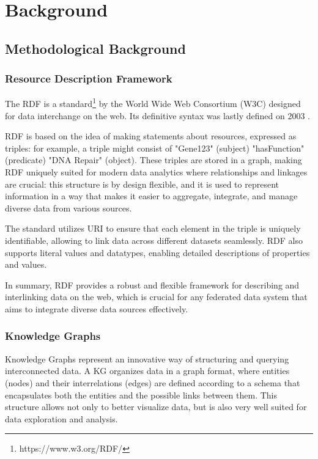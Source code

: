 
\chapter{Background}
\label{chp:background}

\section{Methodological Background}
\subsection{Resource Description Framework}
The \ac{RDF} is a standard\footnote{https://www.w3.org/RDF/} by the World Wide Web Consortium (W3C) designed for data interchange on the web. Its definitive syntax was lastly defined on 2003 \cite{beckett2004rdf}.

\ac{RDF} is based on the idea of making statements about resources, expressed as triples: for example, a triple might consist of "Gene123" (subject) "hasFunction" (predicate) "DNA Repair" (object). These triples are stored in a graph, making \ac{RDF} uniquely suited for modern data analytics where relationships and linkages are crucial: this structure is by design flexible, and it is used to represent information in a way that makes it easier to aggregate, integrate, and manage diverse data from various sources.

The standard utilizes \ac{URI} to ensure that each element in the triple is uniquely identifiable, allowing to link data across different datasets seamlessly. \ac{RDF} also supports literal values and datatypes, enabling detailed descriptions of properties and values.

In summary, \ac{RDF} provides a robust and flexible framework for describing and interlinking data on the web, which is crucial for any federated data system that aims to integrate diverse data sources effectively.

\subsection{Knowledge Graphs}
Knowledge Graphs represent an innovative way of structuring and querying interconnected data. A \ac{KG} organizes data in a graph format, where entities (nodes) and their interrelations (edges) are defined according to a schema that encapsulates both the entities and the possible links between them. This structure allows not only to better visualize data, but is also very well suited for data exploration and analysis.

